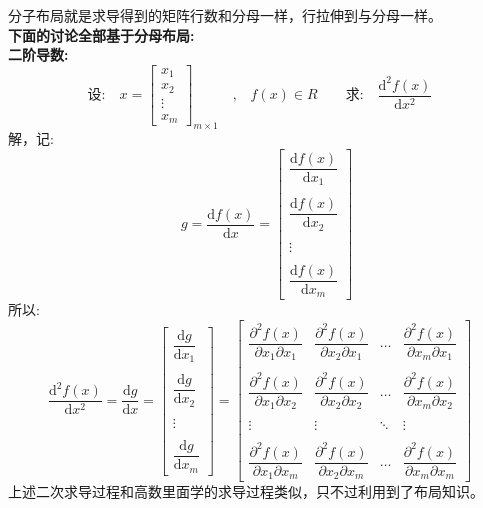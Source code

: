 \documentclass[withoutpreface,bwprint]{cumcmthesis} %
\begin{document}
	分子布局就是求导得到的矩阵行数和分母一样，行拉伸到与分母一样。\\
	\textbf{下面的讨论全部基于分母布局:}\\
	\textbf{二阶导数:}
	\begin{equation*}
		\text{设:}
		\quad x=\left[
			\begin{array}{c}
				x_1\\
				x_2\\
				\vdots\\
				x_m
			\end{array}
		\right]_{m{\times}1}  \quad \text{,} \quad
			f(x) \in R \quad \quad  \text{求:}\quad \dfrac{\mathrm{d}^2 f(x)}{\mathrm{d} x^2}
	\end{equation*}
	解，记:
	\begin{equation*}
		 \quad g=\dfrac{\mathrm{d} f(x)}{\mathrm{d} x}=\left[
			\begin{array}{c}
				\dfrac{\mathrm{d} f(x)}{\mathrm{d} x_1}\\\\
				\dfrac{\mathrm{d} f(x)}{\mathrm{d} x_2}\\\\
				\vdots\\\\
				\dfrac{\mathrm{d} f(x)}{\mathrm{d} x_m}
			\end{array}
		\right]
	\end{equation*}
	所以:\begin{equation}
		\dfrac{\mathrm{d}^2 f(x)}{\mathrm{d} x^2}=\dfrac{\mathrm{d} g}{\mathrm{d} x}=\left[
		\begin{array}{c}
			\dfrac{\mathrm{d} g}{\mathrm{d} x_1}\\\\
			\dfrac{\mathrm{d} g}{\mathrm{d} x_2}\\\\
			\vdots\\\\
			\dfrac{\mathrm{d} g}{\mathrm{d} x_m}
		\end{array}
		\right]=\left[
			\begin{array}{cccc}
				\dfrac{{\partial}^2 f(x)}{{\partial} x_1 \partial x_1} & \dfrac{{\partial}^2 f(x)}{{\partial} x_2 \partial x_1} & \ldots & \dfrac{{\partial}^2 f(x)}{{\partial} x_m \partial x_1}\\\\
				\dfrac{{\partial}^2 f(x)}{{\partial} x_1 \partial x_2} & \dfrac{{\partial}^2 f(x)}{{\partial} x_2 \partial x_2} & \ldots & \dfrac{{\partial}^2 f(x)}{{\partial} x_m \partial x_2}\\\\
				\vdots & \vdots & \ddots & \vdots \\\\
				\dfrac{{\partial}^2 f(x)}{{\partial} x_1 \partial x_m} & \dfrac{{\partial}^2 f(x)}{{\partial} x_2 \partial x_m} & \ldots & \dfrac{{\partial}^2 f(x)}{{\partial} x_m \partial x_m}
			\end{array}				
		\right]
	\end{equation}
	上述二次求导过程和高数里面学的求导过程类似，只不过利用到了布局知识。
\end{document}
